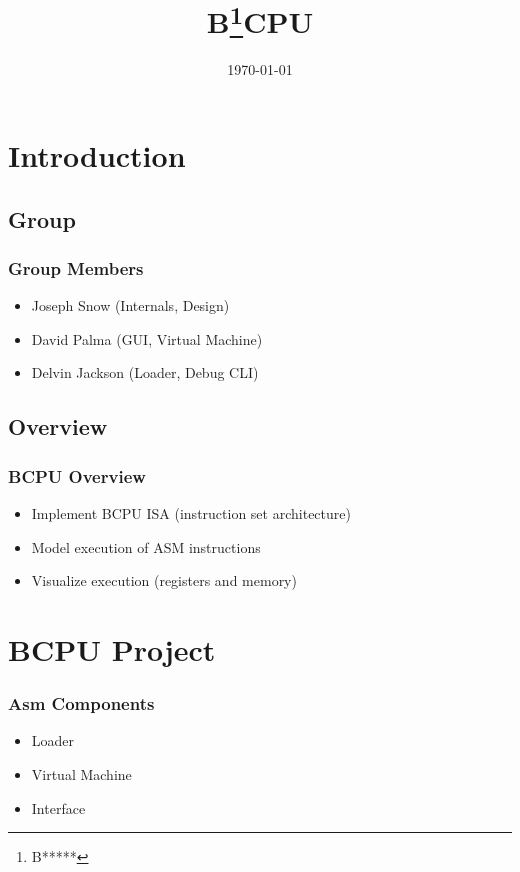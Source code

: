 

\title[Louisiana Tech University]{B\footnote{B*****}CPU}
\date{\today}


\section{Introduction}
\frame{\maketitle}

\subsection{Group}
\begin{frame}
    \frametitle{Group Members}
    \begin{itemize}
	\item Joseph Snow (Internals, Design)
	\item David Palma (GUI, Virtual Machine)
	\item Delvin Jackson (Loader, Debug CLI)
    \end{itemize}
\end{frame}

\subsection{Overview}
\begin{frame}
    \frametitle{BCPU Overview}
    \begin{itemize}
	\item Implement BCPU ISA (instruction set architecture)
	\item Model execution of ASM instructions
	\item Visualize execution (registers and memory)
    \end{itemize}
\end{frame}

\section{BCPU Project}

\begin{frame}
	\frametitle{Asm Components}
	\begin{itemize}
	\item Loader
	\item Virtual Machine
	\item Interface
	\end{itemize}
\end{frame}

